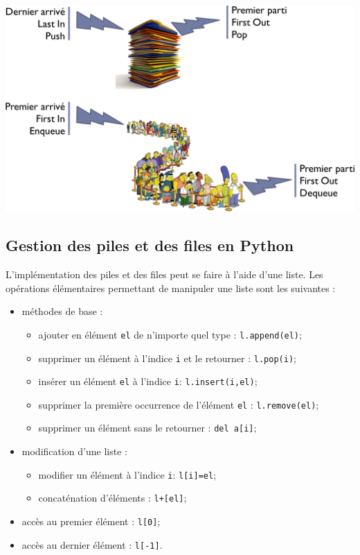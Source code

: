 \documentclass[10pt,fleqn]{article} %
\begin{document}
\begin{minipage}[c]{.45\linewidth}
\includegraphics[width=\linewidth]{images/fifo_lifo}
\end{minipage}
\subsection{Gestion des piles et des files en Python}
L’implémentation des piles et des files peut se faire à l'aide d'une liste. Les opérations élémentaires permettant de manipuler une liste sont les suivantes :
\begin{itemize}[label=,font=\color{ocre}] 
\item méthodes de base :
\begin{itemize}
\item ajouter en élément \texttt{el} de n'importe quel type : \texttt{l.append(el)};
\item supprimer un élément à l'indice \texttt{i} et le retourner : \texttt{l.pop(i)};
\item insérer un élément \texttt{el} à l'indice \texttt{i}: \texttt{l.insert(i,el)};
\item supprimer la première occurrence de l'élément \texttt{el} : \texttt{l.remove(el)};
\item supprimer un élément sans le retourner : \texttt{del a[i]};
\end{itemize}
\item modification d'une liste : 
\begin{itemize}
\item modifier un élément à l'indice \texttt{i}: \texttt{l[i]=el};
\item concaténation d'éléments : \texttt{l+[el]};
\end{itemize}
\item accès au premier élément : \texttt{l[0]};
\item accès au dernier élément : \texttt{l[-1]}.
\end{itemize}
\end{document}
